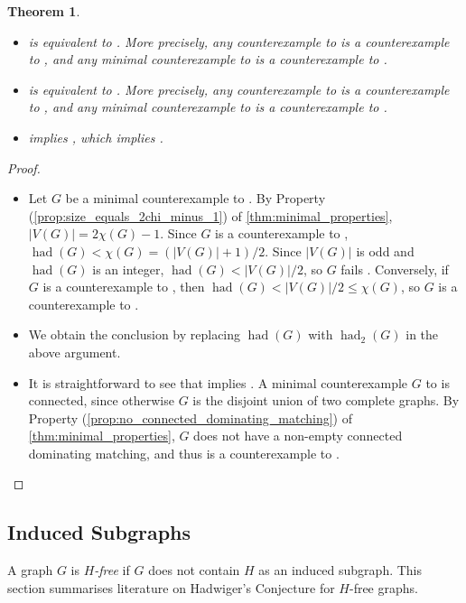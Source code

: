 \documentclass[11pt]{article}
\numberwithin{equation}{section}
\theoremstyle{plain}
\newtheorem{thm}[equation]{Theorem}
\theoremstyle{definition}
\renewcommand{\leq}{\leqslant}
\DeclareMathOperator{\had}{had}
\newcommand{\defn}[1]{\textcolor{green!50!black}{\textit{#1}}}
\newcommand{\propref}[1]{\textup{(\ref{#1})}}
\begin{document}
\begin{thm}
    \label{thm:equiv}
    \begin{itemize}
        \item {} is equivalent to . More precisely, any counterexample to  is a counterexample to , and any minimal counterexample to  is a counterexample to  \citep{PST03}.
        \item {} is equivalent to . More precisely, any counterexample to  is a counterexample to , and any minimal counterexample to  is a counterexample to .
        \item {} implies , which implies .
    \end{itemize}
\end{thm}
\begin{proof}
    \begin{itemize}
        \item Let $G$ be a minimal counterexample to . By Property \propref{prop:size_equals_2chi_minus_1} of \cref{thm:minimal_properties}, $|V(G)| = 2\chi(G) - 1$. Since $G$ is a counterexample to , $\had(G) < \chi(G) = (|V(G)| + 1)/2$. Since $|V(G)|$ is odd and $\had(G)$ is an integer, $\had(G) < |V(G)|/2$, so $G$ fails . Conversely, if $G$ is a counterexample to , then $\had(G) < |V(G)|/2 \leq \chi(G)$, so $G$ is a counterexample to .
        \item We obtain the conclusion by replacing $\had(G)$ with $\had_2(G)$ in the above argument.
        \item It is straightforward to see that  implies . A minimal counterexample $G$ to  is connected, since otherwise $G$ is the disjoint union of two complete graphs. By Property \propref{prop:no_connected_dominating_matching} of \cref{thm:minimal_properties}, $G$ does not have a non-empty connected dominating matching, and thus is a counterexample to . \qedhere
    \end{itemize}
\end{proof}

\subsection{Induced Subgraphs}
\label{ss:induced}
A graph $G$ is \defn{$H$-free} if $G$ does not contain $H$ as an induced subgraph. This section summarises literature on Hadwiger's Conjecture for $H$-free graphs.
\end{document}
